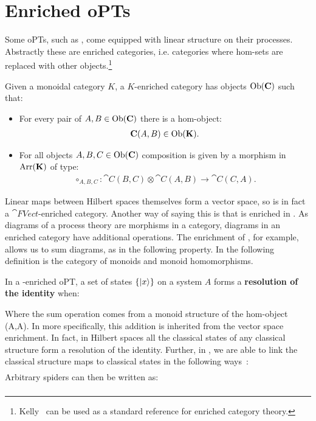 \section{Enriched oPTs}
\label{sec:enrichedoPTs}
Some oPTs, such as , come equipped with linear structure on their processes. Abstractly these are enriched categories, i.e. categories where hom-sets are replaced with other objects.\footnote{Kelly~\cite{kelly1982basic} can be used as a standard reference for enriched category theory.}

\begin{defn}
\label{def:enrichedcat}
Given a monoidal category $K$, a $K$-enriched category  has objects $\mbox{Ob}(\mathbf{C})$ such that:
\begin{itemize}
\item For every pair of $A,B\in\mbox{Ob}(\mathbf{C})$ there is a hom-object:
\begin{align}
\mathbf{C}(A,B)\in \mbox{Ob}(\mathbf{K}).
\end{align}
\item For all objects $A,B,C\in\mbox{Ob}(\mathbf{C})$ composition is given by a morphism in $\mbox{Arr}(\mathbf{K})$ of type:
\begin{align}
 \circ_{A,B,C}:\cat{C}(B,C)\otimes\cat{C}(A,B)\to\cat{C}(C,A).
\end{align}
\end{itemize}
\end{defn}

Linear maps between Hilbert spaces themselves form a vector space, so  is in fact a $\cat{FVect}$-enriched category. Another way of saying this is that  is enriched in . As diagrams of a process theory are morphisms in a category, diagrams in an enriched category have additional operations. The  enrichment of , for example, allows us to sum diagrams, as in the following property. In the following definition  is the category of monoids and monoid homomorphisms.


\begin{defn}
\label{def:resid}
In a -enriched oPT, a set of states $\{| x \rangle\}$ on a system $A$ forms a \textbf{resolution of the identity} when:
\begin{equation}
\label{eq:ResolutionId}

\end{equation}
\end{defn}

\noindent Where the sum operation comes from a monoid structure of the hom-object (A,A). In  more specifically, this addition is inherited  from the vector space enrichment. In fact, in Hilbert spaces all the classical states of any classical structure form a resolution of the identity. Further, in , we are able to link the classical structure maps to classical states in the following ways~\cite{coecke2015generalised}:
\begin{align}
\label{eq:spidersums}

\end{align}
Arbitrary spiders can then be written as:
\begin{align}

\end{align}

